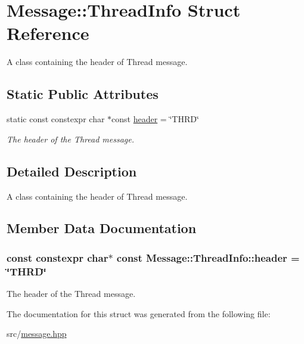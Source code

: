 \hypertarget{struct_message_1_1_thread_info}{}\section{Message\+:\+:Thread\+Info Struct Reference}
\label{struct_message_1_1_thread_info}


A class containing the header of Thread message.  


\subsection*{Static Public Attributes}
\begin{DoxyCompactItemize}
\item 
static const constexpr char $\ast$const \hyperlink{struct_message_1_1_thread_info_a816274d8018a4ad34f796f2aaec27c65}{header} = \char`\"{}T\+H\+RD\char`\"{}
\begin{DoxyCompactList}\small\item\em The header of the Thread message. \end{DoxyCompactList}\end{DoxyCompactItemize}


\subsection{Detailed Description}
A class containing the header of Thread message. 

\subsection{Member Data Documentation}
\subsubsection[{\texorpdfstring{header}{header}}]{\setlength{\rightskip}{0pt plus 5cm}const constexpr char$\ast$ const Message\+::\+Thread\+Info\+::header = \char`\"{}T\+H\+RD\char`\"{}\hspace{0.3cm}{\ttfamily [static]}}\hypertarget{struct_message_1_1_thread_info_a816274d8018a4ad34f796f2aaec27c65}{}\label{struct_message_1_1_thread_info_a816274d8018a4ad34f796f2aaec27c65}


The header of the Thread message. 



The documentation for this struct was generated from the following file\+:\begin{DoxyCompactItemize}
\item 
src/\hyperlink{message_8hpp}{message.\+hpp}\end{DoxyCompactItemize}
